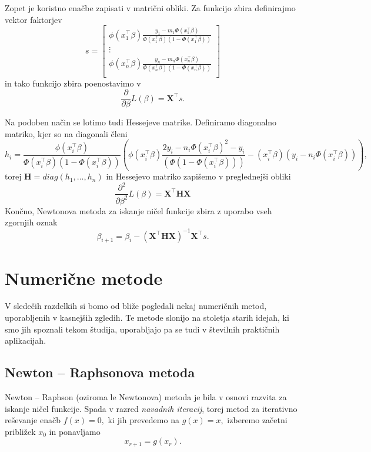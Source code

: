 \documentclass[12pt,a4paper]{amsart}
\theoremstyle{definition} %
\theoremstyle{plain} %
\begin{document}
Zopet je koristno enačbe zapisati v matrični obliki. Za funkcijo zbira definirajmo vektor faktorjev
\[
    s = \begin{bmatrix}
        \phi(x_{1}^\top\beta)\frac{y_{1}-m_{1}\Phi(x_{1}^\top\beta)}{\Phi(x_{1}^\top\beta)(1-\Phi(x_{1}^\top\beta))} \\
        \vdots \\
        \phi(x_{n}^\top\beta)\frac{y_{n}-m_{n}\Phi(x_{n}^\top\beta)}{\Phi(x_{n}^\top\beta)(1-\Phi(x_{n}^\top\beta))} \\
    \end{bmatrix}
\]
in tako funkcijo zbira poenostavimo v
\[
    \frac{\partial}{\partial\beta}L(\beta) = \mathbf{X}^\top s.
\]

Na podoben način se lotimo tudi Hessejeve matrike. Definiramo diagonalno matriko, kjer so na diagonali členi
\[
    h_{i} = \frac{\phi(x_{i}^\top\beta)}{\Phi(x_{i}^\top\beta)(1-\Phi(x_{i}^\top\beta))}\left(\phi(x_{i}^\top\beta)\frac{2y_{i} - n_{i}\Phi(x_{i}^\top\beta)^2 - y_{i}}{(\Phi(1-\Phi(x_{i}^\top\beta)))}
    -(x_{i}^\top\beta)(y_{i}-n_{i}\Phi(x_{i}^\top\beta)) \right),
\]
torej $\mathbf{H} = diag(h_{1},\ldots,h_{n})$ in Hessejevo matriko zapišemo v preglednejši obliki
\[
    \frac{\partial^2}{\partial\beta^2} L(\beta) = \mathbf{X}^\top \mathbf{H X}
\]
Končno, Newtonova metoda za iskanje ničel funkcije zbira z uporabo vseh zgornjih oznak
\begin{equation}
    \beta_{i+1} = \beta_{i} - (\mathbf{X}^\top \mathbf{H X})^{-1}\mathbf{X}^\top s.
\end{equation}


\section{Numerične metode}
V sledečih razdelkih si bomo od bliže pogledali nekaj numeričnih metod, uporabljenih v kasnejših zgledih. Te metode slonijo na stoletja starih
idejah, ki smo jih spoznali tekom študija, uporabljajo pa se tudi v številnih praktičnih aplikacijah.
\subsection{Newton -- Raphsonova metoda} \label{nr}
Newton -- Raphson (oziroma le Newtonova) metoda je bila v osnovi razvita za iskanje ničel funkcije. Spada v razred \textit{navadnih iteracij}, torej metod za iterativno
reševanje enačb $f(x) = 0,$ ki jih prevedemo na $g(x) = x,$ izberemo začetni približek $x_{0}$ in ponavljamo 
\[
    x_{r+1} = g(x_{r}).
\]
\end{document}
